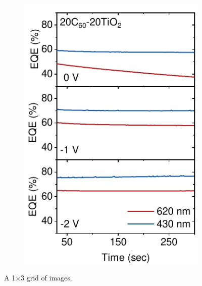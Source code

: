 \begin{figure}[htbp]
\begin{subfigure}{0.32\textwidth}
        \includegraphics[width=\textwidth]{chapters/transport_layers/images/StaticEQE_20_20.pdf}
        \caption{}
        \label{}
    \end{subfigure}
    
    \caption{A 1×3 grid of images.}
    \label{}
\end{figure}



